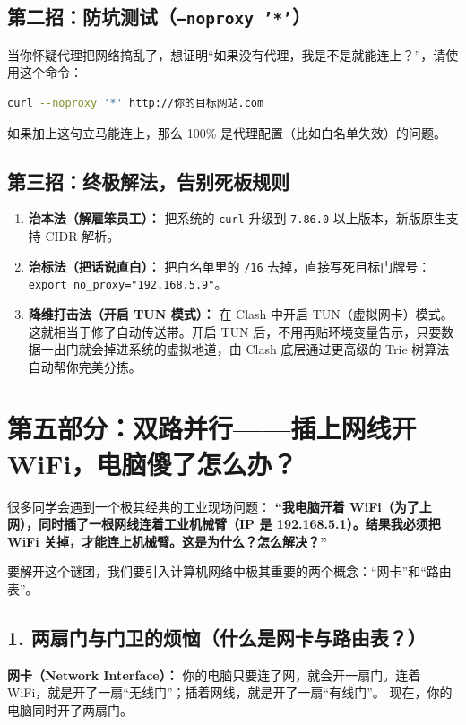 \documentclass[12pt,a4paper]{ctexart}
\begin{document}
\subsection{第二招：防坑测试（\texttt{--noproxy '*'}）}
当你怀疑代理把网络搞乱了，想证明“如果没有代理，我是不是就能连上？”，请使用这个命令：
\begin{lstlisting}[language=bash]
curl --noproxy '*' http://你的目标网站.com
\end{lstlisting}
如果加上这句立马能连上，那么 100\% 是代理配置（比如白名单失效）的问题。

\subsection{第三招：终极解法，告别死板规则}
\begin{enumerate}
    \item \textbf{治本法（解雇笨员工）：} 把系统的 \texttt{curl} 升级到 \texttt{7.86.0} 以上版本，新版原生支持 CIDR 解析。
    \item \textbf{治标法（把话说直白）：} 把白名单里的 \texttt{/16} 去掉，直接写死目标门牌号：\texttt{export no\_proxy="192.168.5.9"}。
    \item \textbf{降维打击法（开启 TUN 模式）：} 在 Clash 中开启 TUN（虚拟网卡）模式。这就相当于修了自动传送带。开启 TUN 后，不用再贴环境变量告示，只要数据一出门就会掉进系统的虚拟地道，由 Clash 底层通过更高级的 Trie 树算法自动帮你完美分拣。
\end{enumerate}

\newpage
\section{第五部分：双路并行——插上网线开WiFi，电脑傻了怎么办？}

很多同学会遇到一个极其经典的工业现场问题：
\textbf{“我电脑开着 WiFi（为了上网），同时插了一根网线连着工业机械臂（IP 是 192.168.5.1）。结果我必须把 WiFi 关掉，才能连上机械臂。这是为什么？怎么解决？”}

要解开这个谜团，我们要引入计算机网络中极其重要的两个概念：“网卡”和“路由表”。

\subsection{1. 两扇门与门卫的烦恼（什么是网卡与路由表？）}
\textbf{网卡（Network Interface）：} 
你的电脑只要连了网，就会开一扇门。连着 WiFi，就是开了一扇“无线门”；插着网线，就是开了一扇“有线门”。
现在，你的电脑同时开了两扇门。
\end{document}
